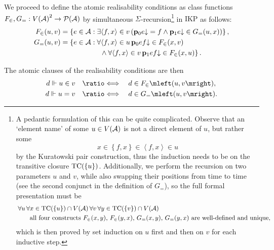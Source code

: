\documentclass[12pt,openany]{book}
\theoremstyle{plain}
\theoremstyle{definition}
\newcommand\tuple[1]{\left\langle #1 \right\rangle}
\newcommand\opA[1]{\mathop{\forall #1}}
\newcommand\opE[1]{\mathop{\exists #1}}
\newcommand\defeqv{\quad \ratio\Longleftrightarrow \quad}
\DeclareMathOperator\TC{TC}
\newcommand\IKP{\mathrm{IKP}}
\newcommand\bp{\mathbf{p}}
\begin{document}
We proceed to define the atomic realisability conditions as class functions $F_\in, G_= : V\mleft(\mathcal{A}\mright)^2 \rightarrow \mathcal{P}\mleft(\mathcal{A}\mright)$ by simultaneous $\Sigma$-recursion\footnote{A pedantic formulation of this can be quite complicated. Observe that an `element name' of some $u \in V\mleft(\mathcal{A}\mright)$ is not a direct element of $u$, but rather some
  \[x \in \left\{f, x\right\} \in \tuple{f, x} \in u\]
  by the Kuratowski pair construction, thus the induction needs to be on the transitive closure $\TC\mleft(\left\{u\right\}\mright)$. Additionally, we perform the recursion on two parameters $u$ and $v$, while also swapping their positions from time to time (see the second conjunct in the definition of $G_=$), so the full formal presentation must be
  \begin{align*}
     & \opA{u} \opA{x \in \TC\mleft(\left\{u\right\}\mright) \cap V\mleft(\mathcal{A}\mright)} \opA{v} \opA{y \in \TC\mleft(\left\{v\right\}\mright) \cap V\mleft(\mathcal{A}\mright)} \\
     & \qquad \text{all four constructs $F_\in\mleft(x, y\mright)$, $F_\in\mleft(y, x\mright)$, $G_=\mleft(x, y\mright)$, $G_=\mleft(y, x\mright)$ are well-defined and unique},
  \end{align*}
  which is then proved by set induction on $u$ first and then on $v$ for each inductive step.} in $\IKP$ as follows:
\begin{align*}
  F_\in\mleft(u, v\mright) & = \left\{e \in \mathcal{A} : \opE{{\tuple{f, x} \in v}} \left(\bp_0 e {\downarrow} = f \land \bp_1 e {\downarrow} \in G_=\mleft(u, x\mright)\right)\right\}, \\
  G_=\mleft(u, v\mright)   & = \begin{aligned}[t]
                                  & {\left\{e \in \mathcal{A} : \opA{{\tuple{f, x} \in u}} \bp_0 e f {\downarrow} \in F_\in\mleft(x, v\mright) \right.}  \\
                                  & \qquad \qquad \left.{} \land \opA{{\tuple{f, x} \in v}} \bp_1 e f {\downarrow} \in F_\in\mleft(x, u\mright)\right\}.
                               \end{aligned}
\end{align*}

The atomic clauses of the realisability conditions are then
\begin{align*}
  d \Vdash u \in v & \defeqv d \in F_\in\mleft(u, v\mright), \\
  d \Vdash u = v   & \defeqv d \in G_=\mleft(u, v\mright).
\end{align*}
\end{document}
